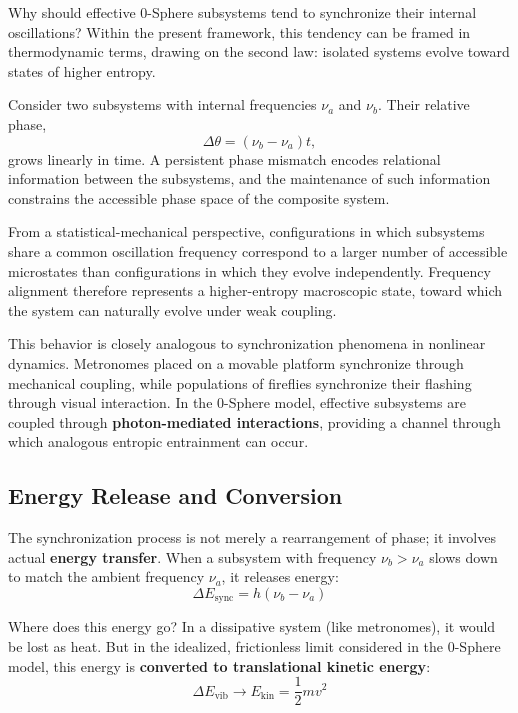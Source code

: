 \documentclass[12pt,letterpaper]{article}
\begin{document}
Why should effective 0-Sphere subsystems tend to synchronize their internal oscillations? Within the present framework, this tendency can be framed in thermodynamic terms, drawing on the second law: isolated systems evolve toward states of higher entropy.

Consider two subsystems with internal frequencies $\nu_a$ and $\nu_b$. Their relative phase,
\[
\Delta\theta = (\nu_b - \nu_a)t,
\]
grows linearly in time. A persistent phase mismatch encodes relational information between the subsystems, and the maintenance of such information constrains the accessible phase space of the composite system.

From a statistical-mechanical perspective, configurations in which subsystems share a common oscillation frequency correspond to a larger number of accessible microstates than configurations in which they evolve independently. Frequency alignment therefore represents a higher-entropy macroscopic state, toward which the system can naturally evolve under weak coupling.

This behavior is closely analogous to synchronization phenomena in nonlinear dynamics. Metronomes placed on a movable platform synchronize through mechanical coupling, while populations of fireflies synchronize their flashing through visual interaction. In the 0-Sphere model, effective subsystems are coupled through \textbf{photon-mediated interactions}, providing a channel through which analogous entropic entrainment can occur.


\subsection{Energy Release and Conversion}
\label{subsec:energy_release}

The synchronization process is not merely a rearrangement of phase; it involves actual \textbf{energy transfer}. When a subsystem with frequency $\nu_b > \nu_a$ slows down to match the ambient frequency $\nu_a$, it releases energy:
\begin{equation}
\Delta E_\text{sync} = h (\nu_b - \nu_a)
\end{equation}

Where does this energy go? In a dissipative system (like metronomes), it would be lost as heat. But in the idealized, frictionless limit considered in the 0-Sphere model, this energy is \textbf{converted to translational kinetic energy}:
\begin{equation}
\Delta E_\text{vib} \rightarrow E_\text{kin} = \frac{1}{2} m v^2
\end{equation}
\end{document}
